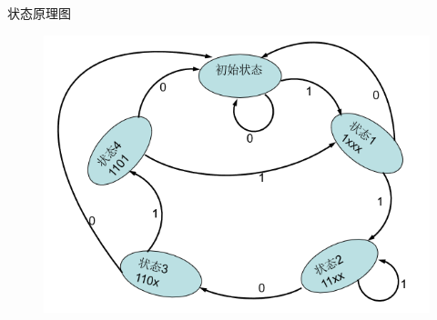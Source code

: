 \documentclass[UTF8]{ctexart}
\begin{document}
状态原理图
\begin{figure}[H]
  \centering
  \includegraphics[width=1\textwidth]{states.png}
\end{figure}
\end{document}
